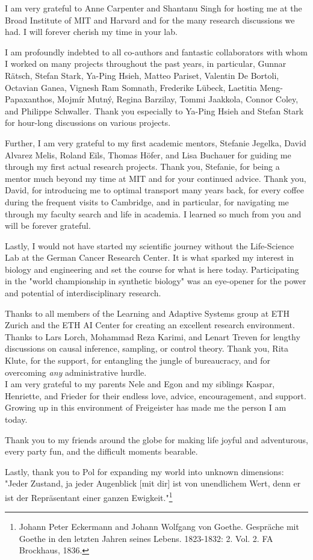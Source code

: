 I am very grateful to Anne Carpenter and Shantanu Singh for hosting me at the Broad Institute of MIT and Harvard and for the many research discussions we had. I will forever cherish my time in your lab.

I am profoundly indebted to all co-authors and fantastic collaborators with whom I worked on many projects throughout the past years, in particular, Gunnar R\"atsch, Stefan Stark, Ya-Ping Hsieh,  Matteo Pariset, Valentin De Bortoli, Octavian Ganea, Vignesh Ram Somnath, Frederike L{\"u}beck, Laetitia Meng-Papaxanthos, Mojm{\'i}r Mutn{\'y}, Regina Barzilay, Tommi Jaakkola, Connor Coley, and Philippe Schwaller. Thank you especially to Ya-Ping Hsieh and Stefan Stark for hour-long discussions on various projects. 

Further, I am very grateful to my first academic mentors, Stefanie Jegelka, David Alvarez Melis, Roland Eils, Thomas H{\"o}fer, and Lisa Buchauer for guiding me through my first actual research projects.
Thank you, Stefanie, for being a mentor much beyond my time at MIT and for your continued advice. 
Thank you, David, for introducing me to optimal transport many years back, for every coffee during the frequent visits to Cambridge, and in particular, for navigating me through my faculty search and life in academia. I learned so much from you and will be forever grateful.

Lastly, I would not have started my scientific journey without the Life-Science Lab at the German Cancer Research Center. It is what sparked my interest in biology and engineering and set the course for what is here today.
Participating in the "world championship in synthetic biology" was an eye-opener for the power and potential of interdisciplinary research.

 Thanks to all members of the Learning and Adaptive Systems group at ETH Zurich and the ETH AI Center for creating an excellent research environment. Thanks to Lars Lorch, Mohammad Reza Karimi, and Lenart Treven for lengthy discussions on causal inference, sampling, or control theory. 
Thank you, Rita Klute, for the support, for entangling the jungle of bureaucracy, and for overcoming \emph{any} administrative hurdle. \\

I am very grateful to my parents Nele and Egon and my siblings Kaspar, Henriette, and Frieder for their endless love, advice, encouragement, and support.
Growing up in this environment of Freigeister has made me the person I am today.

Thank you to my friends around the globe for making life joyful and adventurous, every party fun, and the difficult moments bearable.

Lastly, thank you to Pol for expanding my world into unknown dimensions: "Jeder Zustand, ja jeder Augenblick [mit dir] ist von unendlichem Wert, denn er ist der Repr{\"a}sentant einer ganzen Ewigkeit."\footnote{Johann Peter Eckermann and Johann Wolfgang von Goethe. Gespr{\"a}che mit Goethe in den letzten Jahren seines Lebens. 1823-1832: 2. Vol. 2. FA Brockhaus, 1836.}

\endgroup